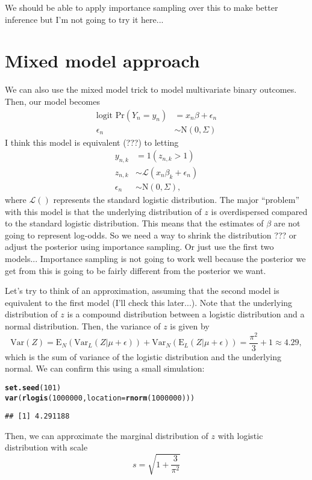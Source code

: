 \documentclass{article}\usepackage[]{graphicx}\usepackage[]{color}
\makeatletter
\newcommand{\hlnum}[1]{\textcolor[rgb]{0.686,0.059,0.569}{#1}}%
\newcommand{\hlstd}[1]{\textcolor[rgb]{0.345,0.345,0.345}{#1}}%
\newcommand{\hlkwc}[1]{\textcolor[rgb]{0.333,0.667,0.333}{#1}}%
\newcommand{\hlkwd}[1]{\textcolor[rgb]{0.737,0.353,0.396}{\textbf{#1}}}%
\newenvironment{kframe}{%
 \def\at@end@of@kframe{}%
 \ifinner\ifhmode%
  \def\at@end@of@kframe{\end{minipage}}%
  \begin{minipage}{\columnwidth}%
 \fi\fi%
 \def\FrameCommand##1{\hskip\@totalleftmargin \hskip-\fboxsep
 \colorbox{shadecolor}{##1}\hskip-\fboxsep
     \hskip-\linewidth \hskip-\@totalleftmargin \hskip\columnwidth}%
 \MakeFramed {\advance\hsize-\width
   \@totalleftmargin\z@ \linewidth\hsize
   \@setminipage}}%
 {\par\unskip\endMakeFramed%
 \at@end@of@kframe}
\newenvironment{knitrout}{}{} %
\makeatother
\begin{document}
We should be able to apply importance sampling over this to make better inference but I'm not going to try it here...

\section{Mixed model approach}

We can also use the mixed model trick to model multivariate binary outcomes. Then, our model becomes
\begin{equation}
\begin{aligned}
\textrm{logit Pr}(Y_n = y_n) &= x_n \beta + \epsilon_n\\
\epsilon_n &\sim \mathrm{N}(0, \Sigma)
\end{aligned}
\end{equation}
I think this model is equivalent (???) to letting 
\begin{equation}
\begin{aligned}
y_{n,k} &= 1(z_{n,k} > 1)\\
z_{n,k} &\sim \mathcal L(x_{n} \beta_k + \epsilon_n) \\
\epsilon_n &\sim \mathrm{N}(0, \Sigma),
\end{aligned}
\end{equation}
where $\mathcal L()$ represents the standard logistic distribution.
The major ``problem'' with this model is that the underlying distribution of $z$ is overdispersed compared to the standard logistic distribution. 
This means that the estimates of $\beta$ are not going to represent log-odds.
So we need a way to shrink the distribution ??? or adjust the posterior using importance sampling.
Or just use the first two models... Importance sampling is not going to work well because the posterior we get from this is going to be fairly different from the posterior we want.

Let's try to think of an approximation, assuming that the second model is equivalent to the first model (I'll check this later...).
Note that the underlying distribution of $z$ is a compound distribution between a logistic distribution and a normal distribution. Then, the variance of $z$ is given by
$$
\mathrm{Var}(Z) = \mathrm{E}_N(\mathrm{Var}_L(Z|\mu + \epsilon)) + \mathrm{Var}_N(\mathrm{E}_L(Z|\mu + \epsilon)) = \frac{\pi^2}{3} + 1 \approx 4.29,
$$
which is the sum of variance of the logistic distribution and the underlying normal.
We can confirm this using a small simulation:
\begin{knitrout}
\color{fgcolor}\begin{kframe}
\begin{alltt}
\hlkwd{set.seed}\hlstd{(}\hlnum{101}\hlstd{)}
\hlkwd{var}\hlstd{(}\hlkwd{rlogis}\hlstd{(}\hlnum{1000000}\hlstd{,} \hlkwc{location}\hlstd{=}\hlkwd{rnorm}\hlstd{(}\hlnum{1000000}\hlstd{)))}
\end{alltt}
\begin{verbatim}
## [1] 4.291188
\end{verbatim}
\end{kframe}
\end{knitrout}

Then, we can approximate the marginal distribution of $z$ with logistic distribution with scale 
$$
s =  \sqrt{1 + \frac{3}{\pi^2}}
$$




\end{document}
